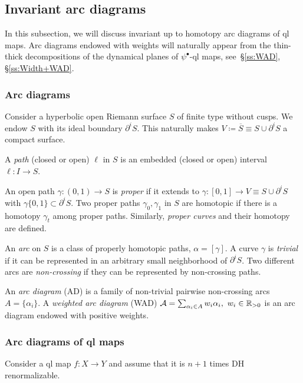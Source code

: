 \documentclass{amsart}
\newcommand{\1}{{\mathbb 1 }}
\renewcommand{\AA}{{\mathcal A}}
\begin{document}
\subsection{Invariant arc diagrams}
\label{sss:InvArcDiagr} In this subsection, we will discuss invariant up to homotopy arc diagrams of ql maps. Arc diagrams endowed with weights will naturally appear from the thin-thick decompositions of the dynamical planes of $\psi^\bullet$-ql maps, see~\S\ref{ss:WAD}, \S\ref{ss:Width+WAD}. 

\subsubsection{Arc diagrams}\label{sss:AD}Consider a hyperbolic open Riemann surface $S$ of finite type without cusps. We endow $S$ with its ideal boundary $\partial^i S$. This naturally makes $V\coloneqq \overline S\equiv S\cup \partial^i S$ a compact surface.


 A \emph{path} (closed or open) $\ell$ in $S$ is an embedded (closed or open) interval $\ell\colon I \to S$. 

An open path $\gamma\colon (0,1)\to S$ is \emph{proper} if it extends to $\gamma\colon [0,1]\to V\equiv S\cup \partial^i S $ with $\gamma\{0,1\}\subset \partial^i S$. 
Two proper paths $\gamma_0,\gamma_1$ in $S$ are homotopic if there is a homotopy $\gamma_t$ among proper paths. Similarly, \emph{proper curves} and their homotopy are defined.


An \emph{arc} on $S$ is a class of properly homotopic paths, $\alpha=[\gamma]$. A curve $\gamma$ is \emph{trivial} if it can be represented in an arbitrary small neighborhood of $\partial^i S$. Two different arcs are \emph{non-crossing} if they can be represented by non-crossing paths. 

An \emph{arc diagram} (AD) is a family of non-trivial pairwise non-crossing arcs $A=\{\alpha_i\}$. A \emph{weighted arc diagram} (WAD) $\AA=\sum_{ \alpha_i \in A} w_i \alpha_i,\ w_i\in \R_{>0}$ is an arc diagram endowed with positive weights.



\subsubsection{Arc diagrams of ql maps}

Consider a ql map $f\colon X\to Y$ and assume that it is $n+1$ times DH renormalizable.
\end{document}
